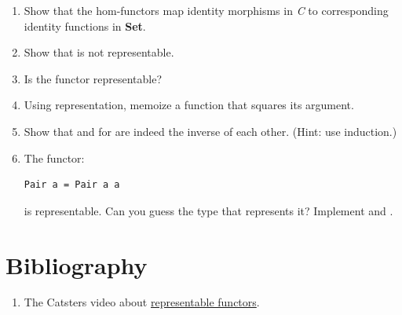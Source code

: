 \begin{enumerate}
\tightlist
\item
  Show that the hom-functors map identity morphisms in \emph{C} to
  corresponding identity functions in \textbf{Set}.
\item
  Show that  is not representable.
\item
  Is the  functor representable?
\item
  Using  representation, memoize a function that squares
  its argument.
\item
  Show that  and  for  are
  indeed the inverse of each other. (Hint: use induction.)
\item
  The functor:

\begin{Verbatim}[commandchars=\\\{\}]
Pair a = Pair a a
\end{Verbatim}
  is representable. Can you guess the type that represents it? Implement
   and .
\end{enumerate}

\section{Bibliography}\label{bibliography}

\begin{enumerate}
\tightlist
\item
  The Catsters video about
  \href{https://www.youtube.com/watch?v=4QgjKUzyrhM}{representable
  functors}.
\end{enumerate}